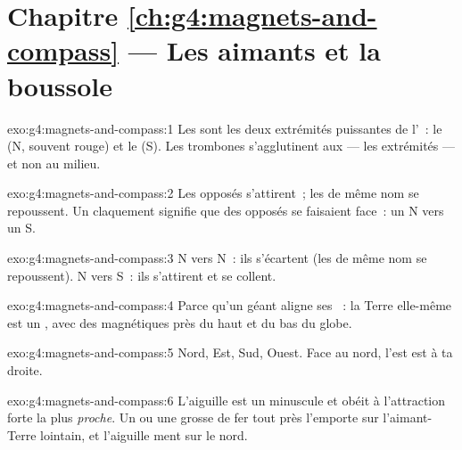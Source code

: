 \section*{Chapitre \ref{ch:g4:magnets-and-compass} --- Les aimants et la boussole}

\begin{solution}{exo:g4:magnets-and-compass:1}
Les  sont les deux extrémités puissantes de l'~: le  (N, souvent rouge) et le  (S). Les trombones
s'agglutinent aux  --- les extrémités --- et non au milieu.
\end{solution}

\begin{solution}{exo:g4:magnets-and-compass:2}
Les  opposés s'attirent~; les  de même nom se repoussent.
Un claquement signifie que des  opposés se faisaient face~: un N
vers un S.
\end{solution}

\begin{solution}{exo:g4:magnets-and-compass:3}
N vers N~: ils s'écartent (les  de même nom se repoussent). N
vers S~: ils s'attirent et se collent.
\end{solution}

\begin{solution}{exo:g4:magnets-and-compass:4}
Parce qu'un  géant aligne ses ~: la Terre elle-même est un
, avec des  magnétiques près du haut et du bas du globe.
\end{solution}

\begin{solution}{exo:g4:magnets-and-compass:5}
Nord, Est, Sud, Ouest. Face au nord, l'est est à ta droite.
\end{solution}

\begin{solution}{exo:g4:magnets-and-compass:6}
L'aiguille est un minuscule  et obéit à l'attraction forte la
plus \emph{proche}. Un  ou une grosse  de fer tout près
l'emporte sur l'aimant-Terre lointain, et l'aiguille ment sur le
nord.
\end{solution}

